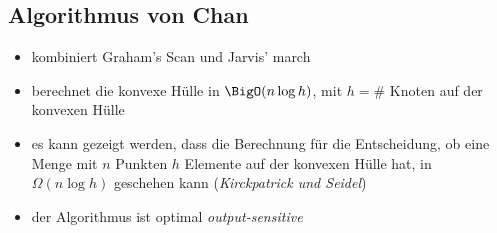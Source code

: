\subsection{Algorithmus von Chan}
\begin{itemize}[itemsep=-1pt]
	\item kombiniert Graham's Scan und Jarvis' march
	\item berechnet die konvexe Hülle in $\BigO(n\log h)$, mit $h=\#$ Knoten auf der konvexen Hülle
	\item es kann gezeigt werden, dass die Berechnung für die Entscheidung, ob eine Menge mit $n$ Punkten $h$ Elemente auf der konvexen Hülle hat, in $\Omega(n\log h)$ geschehen kann (\textit{Kirckpatrick und Seidel})
	\item der Algorithmus ist optimal \textit{output-sensitive}
\end{itemize}
\topbreak
\up\up
